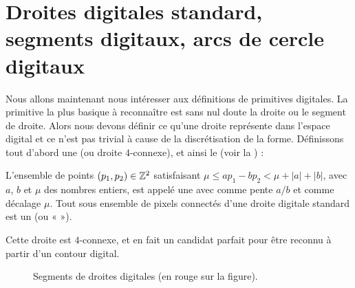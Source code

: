 \section{Droites digitales standard, segments digitaux, arcs de cercle digitaux}%
\label{sec:segments}
%
Nous allons maintenant nous intéresser aux définitions de primitives digitales.
La primitive la plus basique à reconnaître est sans nul doute la droite ou le
segment de droite. Alors nous devons définir ce qu'une droite représente dans
l'espace digital et ce n'est pas trivial à cause de la discrétisation de la
forme. Définissons tout d'abord une  (ou
droite $4$-connexe), et ainsi le  (voir la
) :
%
\begin{definition}{}
  \label{def:DSS}
%
  L'ensemble de points $(p_1,p_2) \in \mathbb{Z}^2$ satisfaisant $\mu \le ap_1 - bp_2 <
  \mu + |a| + |b|$, avec $a$, $b$ et $\mu$ des nombres entiers, est appelé une
   avec comme pente $a/b$ et comme décalage
  $\mu$. Tout sous ensemble de pixels connectés d'une droite digitale standard
  est un  (ou «  »).
%
\end{definition}
%
Cette droite est $4$-connexe, et en fait un candidat parfait pour être reconnu à
partir d'un contour digital.

\begin{figure}[ht]{
    \begin{center}
    
    \end{center}}
    \caption{Segments de droites digitales (en rouge sur la figure).\label{fig:dss-figure}}
\end{figure}


